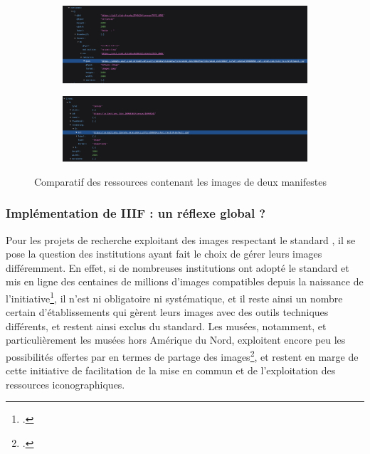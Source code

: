 	\begin{figure}[h]
	\begin{subfigure}{1\linewidth}
		\centering
		\includegraphics[width=15cm]{images/dresden_manifest.png}
	\end{subfigure}
	\hspace{1pt}
	\begin{subfigure}{1\linewidth}
		\centering
		\includegraphics[width=15cm]{images/yale_manifest.png}
	\end{subfigure}
	\hspace{1pt}
	\caption{Comparatif des ressources contenant les images de deux manifestes \iiif}
	\label{fig:manifests_canvas}
\end{figure}

        \subsubsection{Implémentation de IIIF : un réflexe global ?}
Pour les projets de recherche exploitant des images respectant le standard \iiif, il se pose la question des institutions ayant fait le choix de gérer leurs images différemment. En effet, si de nombreuses institutions ont adopté le standard et mis en ligne des centaines de millions d'images compatibles depuis la naissance de l'initiative\footcite{malloryIIIFMuseumsExplained2019}, il n'est ni obligatoire ni systématique, et il reste ainsi un nombre certain d'établissements qui gèrent leurs images avec des outils techniques différents, et restent ainsi exclus du standard. Les musées, notamment, et particulièrement les musées hors Amérique du Nord, exploitent encore peu les possibilités offertes par \iiif en termes de partage des images\footcite{IIIFMuseumsFrance2023}, et restent en marge de cette initiative de facilitation de la mise en commun et de l'exploitation des ressources iconographiques.


